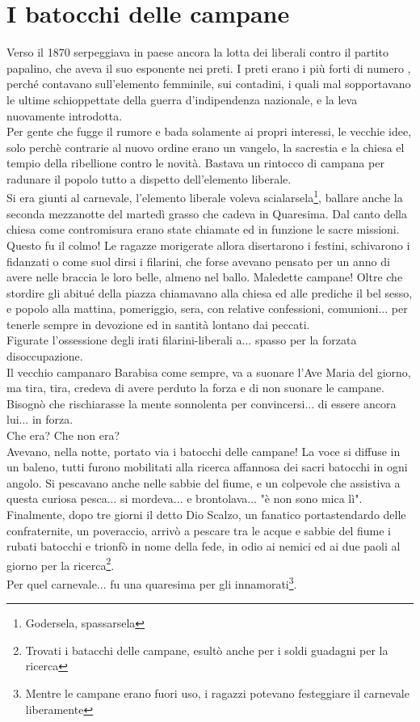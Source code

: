 \documentclass[10pt]{memoir} %
\begin{document}
\chapter{I batocchi delle campane}
Verso il 1870 serpeggiava in paese ancora la lotta dei liberali contro il partito papalino, che aveva il suo esponente nei preti. I preti erano i più forti di numero , perché contavano sull'elemento femminile, sui contadini, i quali mal sopportavano le ultime schioppettate della guerra d'indipendenza nazionale, e la leva nuovamente introdotta.\\
Per gente che fugge il rumore e bada solamente ai propri interessi, le vecchie idee, solo perchè contrarie al nuovo ordine erano un vangelo, la sacrestia e la chiesa el tempio della ribellione contro le novità. Bastava un rintocco di campana per radunare il popolo tutto a dispetto dell'elemento liberale. \\
Si era giunti al carnevale, l'elemento liberale voleva scialarsela\footnote{Godersela, spassarsela}, ballare anche la seconda mezzanotte del martedì grasso che cadeva in Quaresima. Dal canto della chiesa come contromisura erano state chiamate ed in funzione le sacre missioni. Questo fu il colmo! Le ragazze morigerate allora disertarono i festini, schivarono i fidanzati o come suol dirsi i filarini, che forse avevano pensato per un anno di avere nelle braccia le loro belle, almeno nel ballo. Maledette campane! Oltre che stordire gli abitué della piazza chiamavano alla chiesa ed alle prediche il bel sesso, e popolo alla mattina, pomeriggio, sera, con relative confessioni, comunioni... per tenerle sempre in devozione ed in santità lontano dai peccati. \\
Figurate l'ossessione degli irati filarini-liberali a... spasso per la forzata disoccupazione.\\
Il vecchio campanaro Barabisa come sempre, va a suonare l'Ave Maria del giorno, ma tira, tira, credeva di avere perduto la forza e di non suonare le campane. Bisognò che rischiarasse la mente sonnolenta per convincersi... di essere ancora lui... in forza.\\
Che era? Che non era?\\
Avevano, nella notte, portato via i batocchi delle campane! La voce si diffuse in un baleno, tutti furono mobilitati alla ricerca affannosa dei sacri batocchi in ogni angolo. Si pescavano anche nelle sabbie del fiume, e un colpevole che assistiva a questa curiosa pesca... si mordeva... e brontolava... "è non sono mica lì".\\
Finalmente, dopo tre giorni il detto Dio Scalzo, un fanatico portastendardo delle confraternite, un poveraccio, arrivò a pescare tra le acque e sabbie del fiume i rubati batocchi e trionfò in nome della fede, in odio ai nemici ed ai due paoli al giorno per la ricerca\footnote{Trovati i batacchi delle campane, esultò anche per i soldi guadagni per la ricerca}.\\
Per quel carnevale... fu una quaresima per gli innamorati\footnote{Mentre le campane erano fuori uso, i ragazzi potevano festeggiare il carnevale liberamente}.
\end{document}
